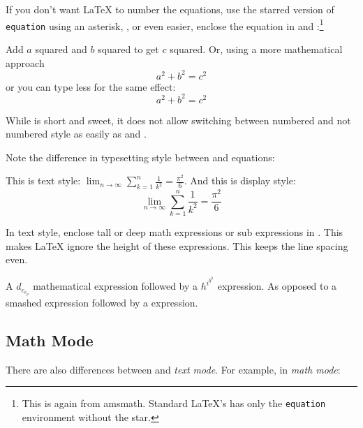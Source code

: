 If you don't want \LaTeX{} to number the equations, use the starred
version of \texttt{equation} using an asterisk, , or even easier, enclose the
equation in \ci{[} and \ci{]}:\footnote{
  This is again from \textsf{amsmath}. Standard \LaTeX{}'s has only the \texttt{equation} environment without the star.}
\begin{example}
Add $a$ squared and $b$ squared
to get $c$ squared. Or, using
a more mathematical approach
 \begin{equation*}
   a^2 + b^2 = c^2
 \end{equation*}
or you can type less for the
same effect:
 \[ a^2 + b^2 = c^2 \]
\end{example}
While \ci{[} is short and sweet, it does not allow switching between numbered and not numbered style as easily as
 and .

Note the difference in typesetting style between  and 
equations: 
\begin{example}
This is text style: 
$\lim_{n \to \infty} 
 \sum_{k=1}^n \frac{1}{k^2} 
 = \frac{\pi^2}{6}$.
And this is display style:
 \begin{equation}
  \lim_{n \to \infty} 
  \sum_{k=1}^n \frac{1}{k^2} 
  = \frac{\pi^2}{6}
 \end{equation}
\end{example}

In text style, enclose tall or deep math expressions or sub
expressions in . This makes \LaTeX{} ignore the height of
these expressions. This keeps the line spacing even.

\begin{example}
A $d_{e_{e_p}}$ mathematical
expression  followed by a
$h^{i^{g^h}}$ expression. As
opposed to a smashed 
 expression 
followed by a
 expression.
\end{example}

\subsection{Math Mode}

There are also differences between \emph{} and \emph{text mode}. For
example, in \emph{math mode}: 

